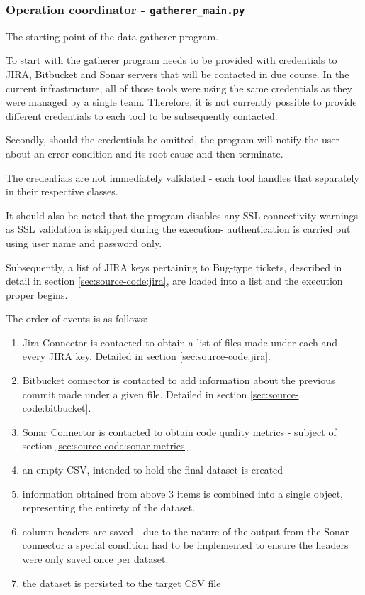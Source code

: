 \subsubsection{Operation coordinator - \texttt{gatherer\_main.py}}\label{sec:source-code:main-gatherer}
The starting point of the data gatherer program.

To start with the gatherer program needs to be provided with credentials to JIRA, Bitbucket and Sonar servers that will be contacted in due course. In the current infrastructure, all of those tools were using the same credentials as they were managed by a single team. Therefore, it is not currently possible to provide different credentials to each tool to be subsequently contacted.

Secondly, should the credentials be omitted, the program will notify the user about an error condition and its root cause and then terminate.

The credentials are not immediately validated - each tool handles that separately in their respective classes.

It should also be noted that the program disables any SSL connectivity warnings as SSL validation is skipped during the execution- authentication is carried out using user name and password only.

Subsequently, a list of JIRA keys pertaining to Bug-type tickets, described in detail in section \ref{sec:source-code:jira}, are loaded into a list and the execution proper begins.

The order of events is as follows:
\begin{enumerate}
    \item Jira Connector is contacted to obtain a list of files made under each and every JIRA key. Detailed in section \ref{sec:source-code:jira}.
    \item Bitbucket connector is contacted to add information about the previous commit made under a given file. Detailed in section \ref{sec:source-code:bitbucket}.
    \item Sonar Connector is contacted to obtain code quality metrics - subject of section \ref{sec:source-code:sonar-metrics}.
    \item an empty CSV, intended to hold the final dataset is created
    \item information obtained from above 3 items is combined into a single object, representing the entirety of the dataset.
    \item column headers are saved - due to the nature of the output from the Sonar connector a special condition had to be implemented to ensure the headers were only saved once per dataset.
    \item the dataset is persisted to the target CSV file
\end{enumerate}

